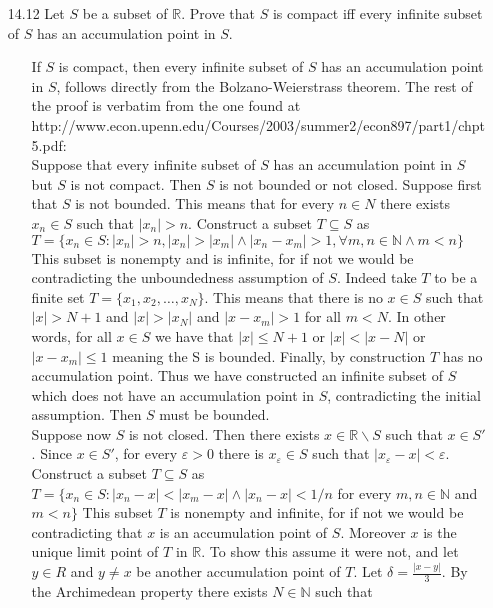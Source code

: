 \documentclass[12pt]{article}
\begin{document}
\begin{enumerate}
\begin{enumerate}
\item[14.12] Let $S$ be a subset of $\mathbb{R}$. Prove that $S$ is compact iff every infinite subset of $S$ has an accumulation point in $S$.
\begin{enumerate}
\item[] If $S$ is compact, then every infinite subset of $S$ has an accumulation point in $S$, follows
directly from the Bolzano-Weierstrass theorem. The rest of the proof is verbatim from the one found at \\
http://www.econ.upenn.edu/Courses/2003/summer2/econ897/part1/chpt5.pdf: 
\\ Suppose that every infinite subset of $S$ has an accumulation point in
$S$ but $S$ is not compact. Then $S$ is not bounded or not closed. Suppose first that $S$ is
not bounded. This means that for every $n \in N$ there exists $x_n \in S$ such that $|x_n| > n$.
Construct a subset $T \subseteq S$ as \\
$T = \{x_n \in S : |x_n| > n, |x_n| > |x_m| \wedge |x_n - x_m| > 1, \forall m,n \in \mathbb{N} \wedge m < n\}$
This subset is nonempty and is infinite, for if not we would be contradicting the
unboundedness assumption of $S$. Indeed take $T$ to be a finite set $T = \{x_1, x_2,\ldots,x_N\}$.
This means that there is no $x \in S$ such that $|x| > N + 1$ and $|x| > |x_N|$ and
$|x - x_m| > 1$ for all $m < N$. In other words, for all $x \in S$ we have that $|x| \leq N + 1$
or $|x| < |x-N|$ or $|x - x_m| \leq 1$ meaning the S is bounded. 
Finally, by construction $T$ has no accumulation point. 
Thus we have constructed an infinite subset of $S$ which
does not have an accumulation point in $S$, contradicting the initial assumption. Then $S$ must
be bounded. \\
Suppose now $S$ is not closed. Then there exists $x \in \mathbb{R}\backslash S$ such that $x \in S'$.
Since $x \in S'$, for every $\varepsilon > 0$ there is $x_\varepsilon \in S$ such that 
$|x_\varepsilon - x| < \varepsilon$. Construct a
subset $T \subseteq S$ as \\
$T = \{x_n \in S : |x_n - x| < |x_m - x| \wedge |x_n - x| < 1/n$ for every $m, n \in \mathbb{N}$ and $m< n\}$
This subset $T$ is nonempty and infinite, for if not we would be contradicting that $x$
is an accumulation point of $S$. Moreover $x$ is the unique limit point of $T$ in $\mathbb{R}$.
To show this assume it were not, and let $y \in R$ and $y \neq x$ be another accumulation point of $T$.
Let $\delta = \frac{|x - y|}{3}$. By the Archimedean property there exists $N \in \mathbb{N}$ such that 

\end{enumerate}
\end{enumerate}
\end{enumerate}
\end{document}
